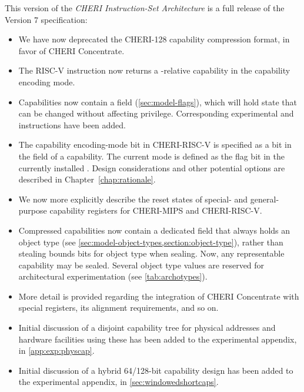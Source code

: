 This version of the \textit{CHERI Instruction-Set Architecture} is a full
release of the Version 7 specification:

\begin{itemize}
\item We have now deprecated the CHERI-128 capability compression format, in
  favor of CHERI Concentrate.

\item The RISC-V  instruction now returns a
  \PCC{}-relative capability in the capability encoding mode.

\item Capabilities now contain a \cflags{} field (\cref{sec:model-flags}),
  which will hold state that
  can be changed without affecting privilege.
  Corresponding experimental  and
   instructions have been added.

\item The capability encoding-mode bit in CHERI-RISC-V is specified as a bit
  in the \cflags{} field of a capability.
  The current mode is defined as the flag bit in the currently installed
  \PCC{}.
  Design considerations and other potential options are described in
  Chapter~\ref{chap:rationale}.

\item We now more explicitly describe the reset states of special- and
  general-purpose capability registers for CHERI-MIPS and CHERI-RISC-V.

\item Compressed capabilities now contain a dedicated \cotype{} field that
  always holds an object type (see
  \cref{sec:model-object-types,section:object-type}), rather than stealing
  bounds bits for object type when sealing.  Now, any representable capability
  may be sealed.  Several object type values are reserved for architectural
  experimentation (see \cref{tab:archotypes}).

\item More detail is provided regarding the integration of CHERI Concentrate
  with special registers, its alignment requirements, and so on.

\item Initial discussion of a disjoint capability tree for physical
  addresses and hardware facilities using these has been added to
  the experimental appendix, in \cref{app:exp:physcap}.

\item Initial discussion of a hybrid 64/128-bit capability design has been
  added to the experimental appendix, in \cref{sec:windowedshortcaps}.


\end{itemize}
